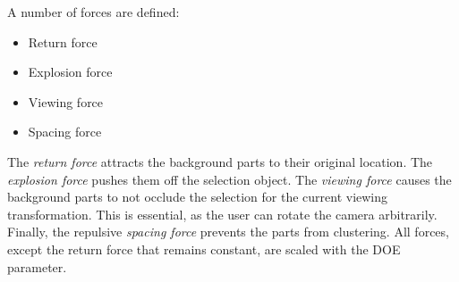A number of forces are defined:
\begin{itemize}
	\item Return force
	\item Explosion force
	\item Viewing force
	\item Spacing force
\end{itemize}

The \emph{return force} attracts the background parts to their original location. The \emph{explosion force} pushes them off the selection object. The \emph{viewing force} causes the background parts to not occlude the selection for the current viewing transformation. This is essential, as the user can rotate the camera arbitrarily. Finally, the repulsive \emph{spacing force} prevents the parts from clustering. All forces, except the return force that remains constant, are scaled with the DOE parameter.



